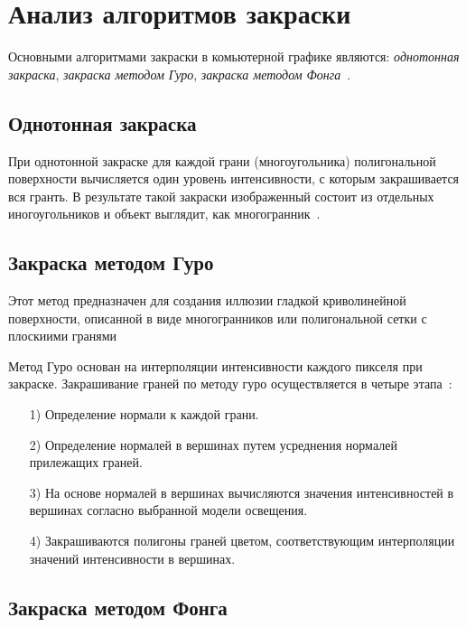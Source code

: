     \section{Анализ алгоритмов закраски}
    
    Основными алгоритмами закраски в комьютерной графике являются: \textit{однотонная закраска}, \textit{закраска методом Гуро}, \textit{закраска методом Фонга}~\cite{rogers}. 
    
    \subsection{Однотонная закраска}
    При однотонной закраске для каждой грани (многоугольника) полигональной поверхности вычисляется один уровень интенсивности, с которым закрашивается вся гранть. В результате такой закраски изображенный состоит из отдельных иногоугольников и объект выглядит, как многогранник~\cite{rogers}.
    
    \subsection{Закраска методом Гуро}
    Этот метод предназначен для создания иллюзии гладкой криволинейной поверхности, описанной в виде многогранников или полигональной сетки с плоскиими гранями\cite{rogers,porev,foley}
    
    Метод Гуро основан на интерполяции интенсивности каждого пикселя при закраске. Закрашивание граней по методу гуро осуществляется в четыре этапа~\cite{porev}:
    
    \begin{enumerate}
    	\item [1)] Определение нормали к каждой грани.
    	\item [2)] Определение нормалей в вершинах путем усреднения нормалей прилежащих граней.
    	\item [3)] На основе нормалей в вершинах вычисляются значения интенсивностей в вершинах согласно выбранной модели освещения.
    	\item [4)] Закрашиваются полигоны граней цветом, соответствующим интерполяции значений интенсивности в вершинах.
    \end{enumerate}
    
    \subsection{Закраска методом Фонга}
    
